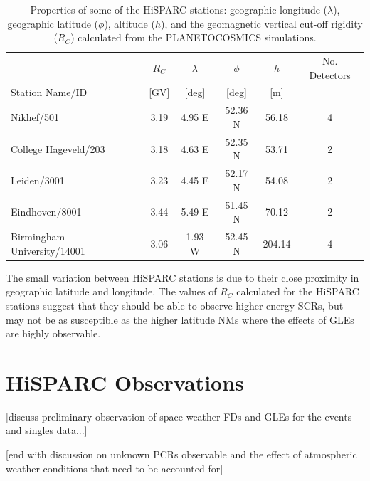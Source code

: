 \begin{table}
	\begin{center}
		\caption{Properties of some of the HiSPARC stations: geographic longitude ($\lambda$), geographic latitude ($\phi$), altitude ($h$), and the geomagnetic vertical cut-off rigidity ($R_C$) calculated from the PLANETOCOSMICS simulations.}
		\label{tab:HS_stns}
		\begin{tabular}{l c c c c c}
			\hline
			& $R_C$  & $\lambda$ & $\phi$  & $h$  & No. Detectors\\
			Station Name/ID & [GV] & [deg] & [deg] & [m]  & \\
			\hline
			Nikhef/501 & 3.19 & 4.95 E & 52.36 N & 56.18 & 4 \\
			College Hageveld/203 & 3.18 & 4.63 E  & 52.35 N & 53.71  & 2 \\
			Leiden/3001 & 3.23 & 4.45 E & 52.17 N & 54.08 & 2 \\
			Eindhoven/8001  & 3.44 & 5.49 E & 51.45 N & 70.12 & 2 \\
			Birmingham University/14001  & 3.06 & 1.93 W & 52.45 N & 204.14 & 4  \\
			\hline
		\end{tabular}
	\end{center}
\end{table}

The small variation between HiSPARC stations is due to their close proximity in geographic latitude and longitude. The values of $R_C$ calculated for the HiSPARC stations suggest that they should be able to observe higher energy SCRs, but may not be as susceptible as the higher latitude NMs where the effects of GLEs are highly observable.



 

\section{HiSPARC Observations}\label{sec:HS_obs}


[discuss preliminary observation of space weather FDs and GLEs for the events and singles data...]

[end with discussion on unknown PCRs observable and the effect of atmospheric weather conditions that need to be accounted for]

